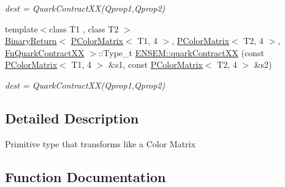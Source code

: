 \begin{DoxyCompactItemize}
\begin{DoxyCompactList}\small\item\em dest = Quark\+Contract\+X\+X(\+Qprop1,\+Qprop2) \end{DoxyCompactList}\item 
{\footnotesize template$<$class T1 , class T2 $>$ }\\\mbox{\hyperlink{structENSEM_1_1BinaryReturn}{Binary\+Return}}$<$ \mbox{\hyperlink{classENSEM_1_1PColorMatrix}{P\+Color\+Matrix}}$<$ T1, 4 $>$, \mbox{\hyperlink{classENSEM_1_1PColorMatrix}{P\+Color\+Matrix}}$<$ T2, 4 $>$, \mbox{\hyperlink{structENSEM_1_1FnQuarkContractXX}{Fn\+Quark\+Contract\+XX}} $>$\+::Type\+\_\+t \mbox{\hyperlink{group__primcolormatrix_ga8f56e6d4ff1d01fb47481eb16006efa7}{E\+N\+S\+E\+M\+::quark\+Contract\+XX}} (const \mbox{\hyperlink{classENSEM_1_1PColorMatrix}{P\+Color\+Matrix}}$<$ T1, 4 $>$ \&s1, const \mbox{\hyperlink{classENSEM_1_1PColorMatrix}{P\+Color\+Matrix}}$<$ T2, 4 $>$ \&s2)
\begin{DoxyCompactList}\small\item\em dest = Quark\+Contract\+X\+X(\+Qprop1,\+Qprop2) \end{DoxyCompactList}\end{DoxyCompactItemize}


\subsection{Detailed Description}
Primitive type that transforms like a Color Matrix 

\subsection{Function Documentation}
\mbox{\label{group__primcolormatrix_ga200705dac956b2d421ea1793fdb916b9}} 
